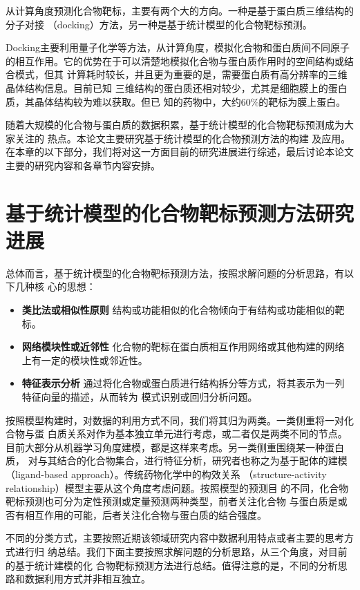 从计算角度预测化合物靶标，主要有两个大的方向\cite{schenone2013target}。一种是基于蛋白质三维结构的分子对接
（docking）方法，另一种是基于统计模型的化合物靶标预测。

Docking主要利用量子化学等方法，从计算角度，模拟化合物和蛋白质间不同原子
的相互作用。它的优势在于可以清楚地模拟化合物与蛋白质作用时的空间结构或结合模式，但其
计算耗时较长，并且更为重要的是，需要蛋白质有高分辨率的三维晶体结构信息。目前已知
三维结构的蛋白质还相对较少，尤其是细胞膜上的蛋白质，其晶体结构较为难以获取。但已
知的药物中，大约60\%的靶标为膜上蛋白\cite{hopkins2009drug,schenone2013target}。

随着大规模的化合物与蛋白质的数据积累，基于统计模型的化合物靶标预测成为大家关注的
热点\cite{ding2014similarity}。本论文主要研究基于统计模型的化合物预测方法的构建
及应用。在本章的以下部分，我们将对这一方面目前的研究进展进行综述，最后讨论本论文
主要的研究内容和各章节内容安排。
\section{基于统计模型的化合物靶标预测方法研究进展}
\label{sec:methodsum}
总体而言，基于统计模型的化合物靶标预测方法，按照求解问题的分析思路，有以下几种核
心的思想：
\begin{itemize}
\item {\bf 类比法或相似性原则}
  结构或功能相似的化合物倾向于有结构或功能相似的靶标。
\item{\bf 网络模块性或近邻性}
  化合物的靶标在蛋白质相互作用网络或其他构建的网络上有一定的模块性或邻近性。
\item{\bf 特征表示分析}
  通过将化合物或蛋白质进行结构拆分等方式，将其表示为一列特征向量的描述，从而转为
  模式识别或回归分析问题。
\end{itemize}

按照模型构建时，对数据的利用方式不同，我们将其归为两类。一类侧重将一对化合物与蛋
白质关系对作为基本独立单元进行考虑，或二者仅是两类不同的节点。
目前大部分从机器学习角度建模，都是这样来考虑。另一类侧重围绕某一种蛋白质，
对与其结合的化合物集合，进行特征分析，研究者也称之为基于配体的建模
\cite{schenone2013target}（ligand-based approach）。传统药物化学中的构效关系\cite{cherkasov2014qsar}
（structure-activity relationship）模型主要从这个角度考虑问题。按照模型的预测目
的不同，化合物靶标预测也可分为定性预测或定量预测两种类型，前者关注化合物
与蛋白质是或否有相互作用的可能，后者关注化合物与蛋白质的结合强度。

不同的分类方式，主要按照近期该领域研究内容中数据利用特点或者主要的思考方式进行归
纳总结。我们下面主要按照求解问题的分析思路，从三个角度，对目前的基于统计建模的化
合物靶标预测方法进行总结。值得注意的是，不同的分析思路和数据利用方式并非相互独立。
